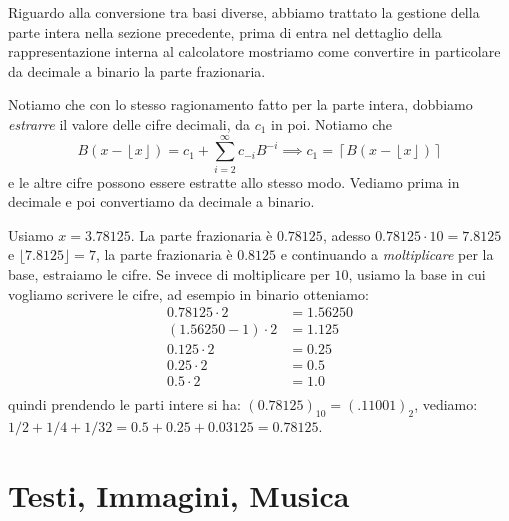 Riguardo alla conversione tra basi diverse, abbiamo trattato la gestione della
parte intera nella sezione precedente, prima di entra nel dettaglio della
rappresentazione interna al calcolatore mostriamo come convertire in
particolare da decimale a binario la parte frazionaria.

Notiamo che con lo stesso ragionamento fatto per la parte intera, dobbiamo
\emph{estrarre} il valore delle cifre decimali, da $c_1$ in poi. Notiamo che \[
B(x - \left\lfloor x \right \rfloor) = c_1 + \sum_{i=2}^{\infty} c_{-i}B^{-i}
\implies c_1 = \left\lceil B(x - \left\lfloor x \right\rfloor) \right\rceil \]
e le altre cifre possono essere estratte allo stesso modo. Vediamo prima in
decimale e poi convertiamo da decimale a binario.

\begin{ex} Usiamo $x = 3.78125$. La parte frazionaria è $0.78125$, adesso
$0.78125\cdot 10 = 7.8125$ e $\lfloor 7.8125 \rfloor = 7$, la parte frazionaria
è $0.8125$ e continuando a \emph{moltiplicare} per la base, estraiamo le cifre.
Se invece di moltiplicare per $10$, usiamo la base in cui vogliamo scrivere le
cifre, ad esempio in binario otteniamo:
\begin{align*}
		 0.78125 \cdot 2 &= 1.56250\\
		 (1.56250-1) \cdot 2 &= 1.125\\
		 0.125 \cdot 2 &= 0.25\\
		 0.25  \cdot 2 &= 0.5\\
		 0.5 \cdot 2 &= 1.0\\
\end{align*}
quindi prendendo le parti intere si ha: $(0.78125)_{10} = (.11001)_2$, vediamo: $1/2+1/4+1/32 = 0.5 + 0.25 + 0.03125 = 0.78125$.
\end{ex}

\section{Testi, Immagini, Musica}
